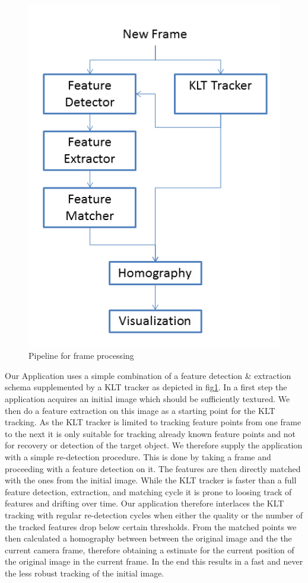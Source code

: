 \documentclass[10pt,conference,compsocconf]{IEEEtran}
\begin{document}
\begin{figure}
	\includegraphics[width=\columnwidth]{overview.png}
	\caption{Pipeline for frame processing}
	\label{fig:overview}
\end{figure}

Our Application uses a simple combination of a feature detection \& extraction schema supplemented by a KLT tracker as depicted in fig\ref{fig:overview}. In a first step the application acquires an initial image which should be sufficiently textured. We then do a feature extraction on this image as a starting point for the KLT tracking. As the KLT tracker is limited to  tracking feature points from one frame to the next it is only suitable for tracking already known feature points and not for recovery or detection of the target object. We therefore supply the application with a simple re-detection procedure. This is done by taking a frame and proceeding with a feature detection on it. The features are then directly matched with the ones from the initial image. While the KLT tracker is faster than a full feature detection, extraction, and matching cycle it is prone to loosing track of features and drifting over time. Our application therefore interlaces the KLT tracking with regular re-detection cycles when either the quality or the number of the tracked features drop below certain thresholds. From the matched points we then calculated a homography between between the original image and the the current camera frame, therefore obtaining a estimate for the current position of the original image in the current frame.  In the end this results in a fast and never the less robust tracking of the initial image.
\end{document}
